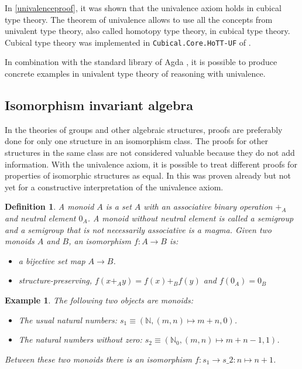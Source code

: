 \documentclass[12pt,a4paper,twoside,xetex]{book} %
\newcommand{\keyword}[1]{\emph{#1}\index{#1}}
\newtheorem{definition}[theorem]{Definition}
\newtheorem{example}[theorem]{Example}
\begin{document}
In \cref{univalenceproof}, it was shown that the univalence axiom holds in 
cubical type theory. The theorem of univalence allows to use all the 
concepts from univalent type theory, also called homotopy type theory, in 
cubical type theory. Cubical type theory was implemented in 
\texttt{Cubical.Core.HoTT-UF} of \cite{Moertberg2018}.

In combination with the standard library of Agda \cite{Danielsson2019}, it is 
possible to produce concrete examples in univalent type theory of reasoning 
with univalence.

\subsection{Isomorphism invariant algebra}\label{magmas}

In the theories of groups and other algebraic structures, proofs are preferably 
done for only one structure in an isomorphism class. The proofs for other 
structures in the same class are not considered valuable because they do not 
add information. With the univalence axiom, it is possible to treat 
different proofs for properties of isomorphic structures as equal. In \cite{Danielsson2012} this was proven already but not yet for a constructive interpretation of the univalence axiom.

\begin{definition}
A \keyword{monoid} $A$ is a set $A$ with an associative binary operation $+_A$ and neutral element $0_A$. A monoid without neutral element is called a \keyword{semigroup} and a semigroup that is not necessarily associative is a \keyword{magma}. Given two monoids $A$ and $B$, an isomorphism $f : A \rightarrow B$ is:
\begin{itemize}
 \item a bijective set map $A \rightarrow B$.
 \item structure-preserving, $f(x +_A y) = f(x) +_B f(y)$ and $f(0_A) = 0_B$
\end{itemize}
\end{definition}
 
 
 
\begin{example}
The following two objects are monoids:
\begin{itemize}
 \item The usual natural numbers: $s_1  \equiv (\mathbb{N}, (m,n)\mapsto m+n, 0)$.
 \item The natural numbers without zero: $s_2 \equiv (\mathbb{N}_0, 
(m,n)\mapsto m+n -1, 1)$.
\end{itemize}
 Between these two monoids there is an isomorphism $f : s_1 \rightarrow s\_2 : n \mapsto n +1$. 
\end{example}
\end{document}
